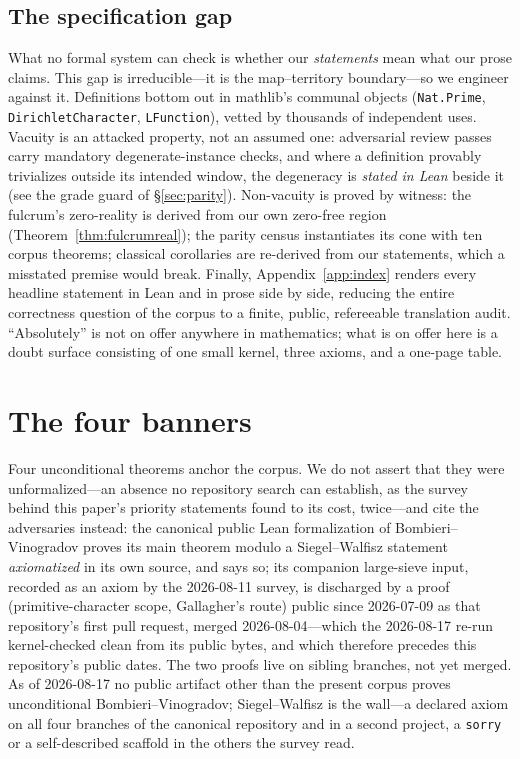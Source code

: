 \documentclass{CUP-JNL-FMP}
\theoremstyle{remark}
\begin{document}
\subsection{The specification gap}
What no formal system can check is whether our \emph{statements} mean what
our prose claims. This gap is irreducible---it is the map--territory
boundary---so we engineer against it. Definitions bottom out in
\textsf{mathlib}'s communal objects (\texttt{Nat.Prime},
\texttt{DirichletCharacter}, \texttt{LFunction}), vetted by thousands of
independent uses. Vacuity is an attacked property, not an assumed one:
adversarial review passes carry mandatory degenerate-instance checks, and
where a definition provably trivializes outside its intended window, the
degeneracy is \emph{stated in Lean} beside it (see the grade guard of
\S\ref{sec:parity}). Non-vacuity is proved by witness: the fulcrum's
zero-reality is derived from our own zero-free region
(Theorem~\ref{thm:fulcrumreal}); the parity census instantiates its cone
with ten corpus theorems; classical corollaries are re-derived from our
statements, which a misstated premise would break. Finally,
Appendix~\ref{app:index} renders every headline statement in Lean and in
prose side by side, reducing the entire correctness question of the corpus
to a finite, public, refereeable translation audit. ``Absolutely'' is not
on offer anywhere in mathematics; what is on offer here is a doubt surface
consisting of one small kernel, three axioms, and a one-page table.

\section{The four banners}\label{sec:banners}

Four unconditional theorems anchor the corpus. We do not assert that they
were unformalized---an absence no repository search can establish, as the
survey behind this paper's priority statements found to its cost, twice---and
cite the adversaries instead: the canonical public Lean formalization of
Bombieri--Vinogradov proves its main theorem modulo a Siegel--Walfisz
statement \emph{axiomatized} in its own source, and says so; its companion
large-sieve input, recorded as an axiom by the 2026-08-11 survey, is
discharged by a proof (primitive-character scope, Gallagher's route) public
since 2026-07-09 as that repository's first pull request, merged
2026-08-04---which the 2026-08-17 re-run kernel-checked clean from its
public bytes, and which therefore precedes this repository's public dates.
The two proofs live on sibling branches, not yet merged. As of 2026-08-17 no
public artifact other than the present corpus proves unconditional
Bombieri--Vinogradov; Siegel--Walfisz is the wall---a declared axiom on all
four branches of the canonical repository and in a second project, a
\texttt{sorry} or a self-described scaffold in the others the survey read.
\end{document}
